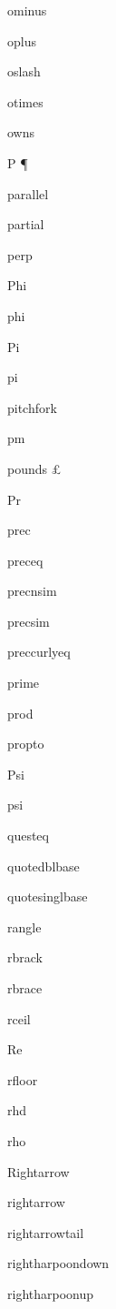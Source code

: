 \documentclass{article}
\begin{document}
ominus    \ominus{}

oplus    \oplus{}

oslash    \oslash{}

otimes    \otimes{}

owns    \owns{}


P    \P{}

parallel    \parallel{}

partial    \partial{}

perp    \perp{}

Phi    \Phi{}

phi    \phi{}

Pi    \Pi{}

pi    \pi{}

pitchfork    \pitchfork{}

pm    \pm{}

pounds    \pounds{}

Pr    \Pr{}

prec    \prec{}

preceq    \preceq{}

precnsim    \precnsim{}

precsim    \precsim{}

preccurlyeq    \preccurlyeq{}

prime    \prime{}

prod    \prod{}

propto    \propto{}

Psi    \Psi{}

psi    \psi{}


questeq    \questeq{}

quotedblbase    \quotedblbase{}

quotesinglbase    \quotesinglbase{}


rangle    \rangle{}

rbrack    \rbrack{}

rbrace    \rbrace{}

rceil    \rceil{}

Re    \Re{}

rfloor    \rfloor{}

rhd    \rhd{}

rho    \rho{}

Rightarrow    \Rightarrow{}

rightarrow    \rightarrow{}

rightarrowtail    \rightarrowtail{}

rightharpoondown    \rightharpoondown{}

rightharpoonup    \rightharpoonup{}
\end{document}
